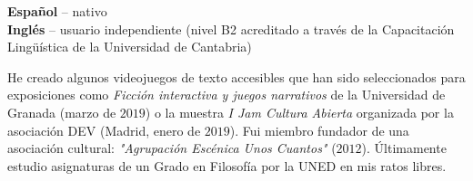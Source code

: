 \documentclass[9pt]{developercv} %
\begin{document}
%
%

\begin{minipage}[t]{0.35\textwidth}
	\vspace{-\baselineskip} %

	
	\textbf{Español} -- nativo\\
	\textbf{Inglés} -- usuario independiente (nivel B2 acreditado a través de la Capacitación Lingüística de la Universidad de Cantabria)\\
\end{minipage}
\hfill
\begin{minipage}[t]{0.6\textwidth}
	\vspace{-\baselineskip} %
	

	He creado algunos videojuegos de texto accesibles que han sido seleccionados para exposiciones como \emph{Ficción interactiva y juegos narrativos} de la Universidad de Granada (marzo de $2019$) o la muestra \emph{I Jam Cultura Abierta} organizada por la asociación DEV (Madrid, enero de $2019$). Fui miembro fundador de una asociación cultural: \emph{"Agrupación Escénica Unos Cuantos"} ($2012$). Últimamente estudio asignaturas de un Grado en Filosofía por la UNED en mis ratos libres.
\end{minipage}
\end{document}
